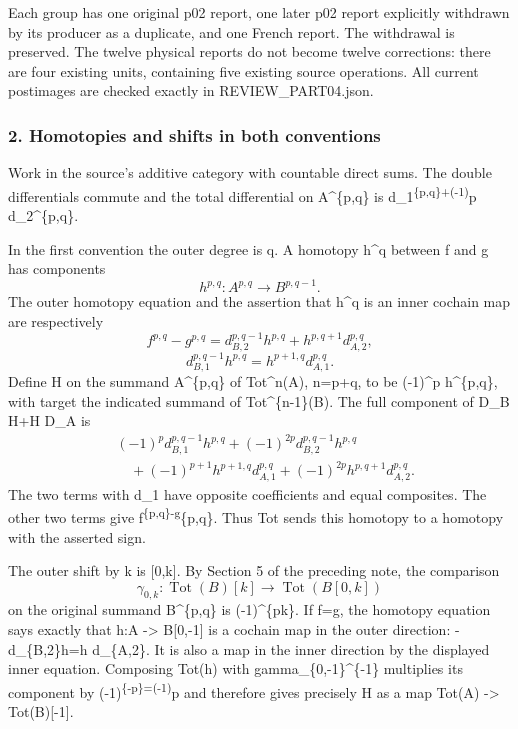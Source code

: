 Each group has one original p02 report, one later p02 report explicitly withdrawn by its producer as a duplicate, and one French report. The withdrawal is preserved. The twelve physical reports do not become twelve corrections: there are four existing units, containing five existing source operations. All current postimages are checked exactly in REVIEW\_PART04.json.

\subsubsection{2. Homotopies and shifts in both conventions}\label{homotopies-and-shifts-in-both-conventions}

Work in the source's additive category with countable direct sums. The double differentials commute and the total differential on A\^{}\{p,q\} is d\_1\textsuperscript{\{p,q\}+(-1)}p d\_2\^{}\{p,q\}.

In the first convention the outer degree is q. A homotopy h\^{}q between f and g has components \[
h^{p,q}:A^{p,q}\longrightarrow B^{p,q-1}.
\] The outer homotopy equation and the assertion that h\^{}q is an inner cochain map are respectively \[
f^{p,q}-g^{p,q}
=d_{B,2}^{p,q-1}h^{p,q}+h^{p,q+1}d_{A,2}^{p,q},
\] \[
d_{B,1}^{p,q-1}h^{p,q}=h^{p+1,q}d_{A,1}^{p,q}.
\] Define H on the summand A\^{}\{p,q\} of Tot\^{}n(A), n=p+q, to be (-1)\^{}p h\^{}\{p,q\}, with target the indicated summand of Tot\^{}\{n-1\}(B). The full component of D\_B H+H D\_A is \[
\begin{aligned}
&(-1)^p d_{B,1}^{p,q-1}h^{p,q}
 +(-1)^{2p}d_{B,2}^{p,q-1}h^{p,q}\\
&\hspace{1em}
 +(-1)^{p+1}h^{p+1,q}d_{A,1}^{p,q}
 +(-1)^{2p}h^{p,q+1}d_{A,2}^{p,q}.
\end{aligned}
\] The two terms with d\_1 have opposite coefficients and equal composites. The other two terms give f\textsuperscript{\{p,q\}-g}\{p,q\}. Thus Tot sends this homotopy to a homotopy with the asserted sign.

The outer shift by k is {[}0,k{]}. By Section 5 of the preceding note, the comparison \[
\gamma_{0,k}:\operatorname{Tot}(B)[k]
\longrightarrow\operatorname{Tot}(B[0,k])
\] on the original summand B\^{}\{p,q\} is (-1)\^{}\{pk\}. If f=g, the homotopy equation says exactly that h:A -\textgreater{} B{[}0,-1{]} is a cochain map in the outer direction: -d\_\{B,2\}h=h d\_\{A,2\}. It is also a map in the inner direction by the displayed inner equation. Composing Tot(h) with gamma\_\{0,-1\}\^{}\{-1\} multiplies its component by (-1)\textsuperscript{\{-p\}=(-1)}p and therefore gives precisely H as a map Tot(A) -\textgreater{} Tot(B){[}-1{]}.

